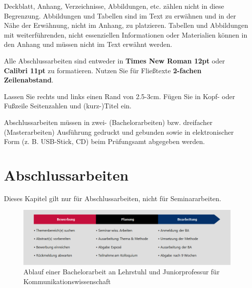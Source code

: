 \documentclass[
  letterpaper,
  DIV=11]{scrreprt}
\begin{document}
Deckblatt, Anhang, Verzeichnisse, Abbildungen, etc. zählen nicht in
diese Begrenzung. Abbildungen und Tabellen sind im Text zu erwähnen und
in der Nähe der Erwähnung, nicht im Anhang, zu platzieren. Tabellen und
Abbildungen mit weiterführenden, nicht essenziellen Informationen oder
Materialien können in den Anhang und müssen nicht im Text erwähnt
werden.

Alle Abschlussarbeiten sind entweder in \textbf{Times New Roman 12pt}
oder \textbf{Calibri 11pt} zu formatieren. Nutzen Sie für Fließtexte
\textbf{2-fachen Zeilenabstand}.

Lassen Sie rechts und links einen Rand von 2.5-3cm. Fügen Sie in Kopf-
oder Fußzeile Seitenzahlen und (kurz-)Titel ein.

Abschlussarbeiten müssen in zwei- (Bachelorarbeiten) bzw. dreifacher
(Masterarbeiten) Ausführung gedruckt und gebunden sowie in
elektronischer Form (z. B. USB-Stick, CD) beim Prüfungsamt abgegeben
werden.

\hypertarget{abschlussarbeiten}{%
\chapter{Abschlussarbeiten}\label{abschlussarbeiten}}

\begin{tcolorbox}[enhanced jigsaw, coltitle=black, arc=.35mm, breakable, title=\textcolor{quarto-callout-important-color}{\faExclamation}\hspace{0.5em}{Wichtig}, leftrule=.75mm, bottomtitle=1mm, colframe=quarto-callout-important-color-frame, toprule=.15mm, opacitybacktitle=0.6, colbacktitle=quarto-callout-important-color!10!white, opacityback=0, rightrule=.15mm, toptitle=1mm, left=2mm, titlerule=0mm, bottomrule=.15mm, colback=white]

Dieses Kapitel gilt nur für Abschlussarbeiten, nicht für
Seminararbeiten.

\end{tcolorbox}

\begin{figure}

{\centering \includegraphics{./img/ablauf.png}

}

\caption{\label{fig-ablauf}Ablauf einer Bachelorarbeit an Lehrstuhl und
Juniorprofessur für Kommunikationswissenschaft}

\end{figure}
\end{document}
